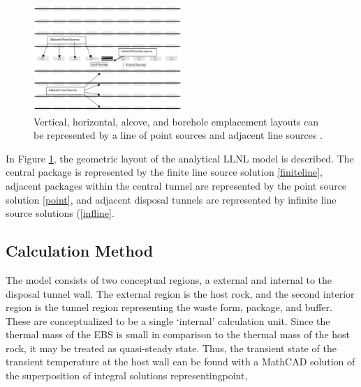 \documentclass{anstrans}
\begin{document}
\begin{figure}[h!]
  \begin{center}
    \includegraphics[width=0.5\textwidth]{llnlConcept.eps}
  \end{center}
  \caption{Vertical, horizontal, alcove, and borehole emplacement layouts can be 
  represented by a line of point sources and adjacent line sources 
  \cite{sutton_investigations_2011}.}
  \label{fig:llnl}
\end{figure}

In Figure \ref{fig:llnl}, the geometric layout of the analytical \gls{LLNL} 
model is described. The central package is represented by the finite line source solution 
\eqref{finiteline}, adjacent packages within the central tunnel are represented 
by the point source solution \eqref{point}, and adjacent disposal tunnels are 
represented by infinite line source solutions (\eqref{infline}.

\subsection{Calculation Method}

The model consists of two conceptual regions, a external and internal to the 
disposal tunnel wall.
The external region is the host rock, and the second interior region is the 
tunnel region representing the waste form, package, and buffer. These are 
conceptualized to be a single `internal' calculation unit.  Since the thermal 
mass of the \gls{EBS} is small in comparison to the thermal mass of the host 
rock, it may be treated as quasi-steady state. Thus, the transient state of the 
transient temperature at the host wall can be found with a 
MathCAD solution of the superposition of integral solutions
representingpoint, 
\end{document}
